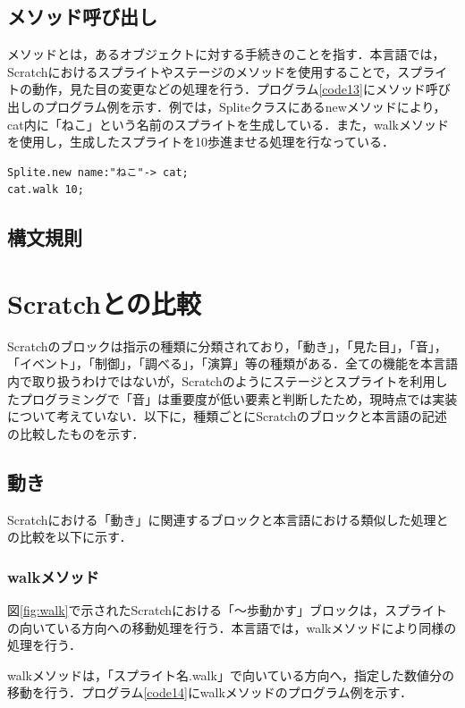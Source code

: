 \documentclass[10pt,a4j]{ltjsarticle}
\begin{document}
\subsection{メソッド呼び出し}
メソッドとは，あるオブジェクトに対する手続きのことを指す．本言語では，Scratchにおけるスプライトやステージのメソッドを使用することで，スプライトの動作，見た目の変更などの処理を行う．プログラム\ref{code13}にメソッド呼び出しのプログラム例を示す．例では，Spliteクラスにあるnewメソッドにより，cat内に「ねこ」という名前のスプライトを生成している．また，walkメソッドを使用し，生成したスプライトを10歩進ませる処理を行なっている．

\begin{lstlisting}[caption=メソッド呼び出しのプログラム例, label=code13]
Splite.new name:"ねこ"-> cat;
cat.walk 10; 
\end{lstlisting}

\subsection{構文規則}

\clearpage

\section{Scratchとの比較}
Scratchのブロックは指示の種類に分類されており，「動き」，「見た目」，「音」，「イベント」，「制御」，「調べる」，「演算」等の種類がある．全ての機能を本言語内で取り扱うわけではないが，Scratchのようにステージとスプライトを利用したプログラミングで「音」は重要度が低い要素と判断したため，現時点では実装について考えていない．以下に，種類ごとにScratchのブロックと本言語の記述の比較したものを示す．

\subsection{動き}
Scratchにおける「動き」に関連するブロックと本言語における類似した処理との比較を以下に示す．
\subsubsection{walkメソッド}
図\ref{fig:walk}で示されたScratchにおける「〜歩動かす」ブロックは，スプライトの向いている方向への移動処理を行う．本言語では，walkメソッドにより同様の処理を行う．

walkメソッドは，「スプライト名.walk」で向いている方向へ，指定した数値分の移動を行う．プログラム\ref{code14}にwalkメソッドのプログラム例を示す．
\end{document}
